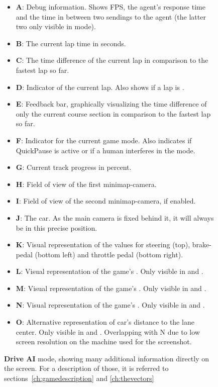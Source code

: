 \begin{figure}[h!t]
	\caption[Screenshot: drive AI mode with annotations]{\textbf{Drive AI} mode, showing many additional information directly on the screen. For a description of those, it is referred to sections~\ref{ch:gamedescription} and \ref{ch:thevectors}}
	\label{fig:aidriveshot}
	\begin{itemize}
		\small
		\setlength\itemsep{0.1em}
		\item \textbf{A}: Debug information. Shows FPS, the agent's response time and the time in between two sendings to the agent (the latter two only visible in  mode).
		\item \textbf{B}: The current lap time in seconds.
		\item \textbf{C}: The time difference of the current lap in comparison to the fastest lap so far.
		\item \textbf{D}: Indicator of the current lap. Also shows if a lap is .
		\item \textbf{E}: Feedback bar, graphically visualizing the time difference of only the current course section in comparison to the fastest lap so far.
		\item \textbf{F}: Indicator for the current game mode. Also indicates if QuickPause is active or if a human interferes in the  mode.
		\item \textbf{G}: Current track progress in percent.
		\item \textbf{H}: Field of view of the first minimap-camera.
		\item \textbf{I}: Field of view of the second minimap-camera, if enabled.
		\item \textbf{J}: The car. As the main camera is fixed behind it, it will always be in this precise position.
		\item \textbf{K}: Visual representation of the values for steering (top), brake-pedal (bottom left) and throttle pedal (bottom right).
		\item \textbf{L}: Visual representation of the game's . Only visible in  and .
		\item \textbf{M}: Visual representation of the game's . Only visible in  and .
		\item \textbf{N}: Visual representation of the game's . Only visible in  and .
		\item \textbf{O}: Alternative representation of car's distance to the lane center. Only visible in  and . Overlapping with N due to low screen resolution on the machine used for the screenshot.

\end{itemize}
\end{figure}
